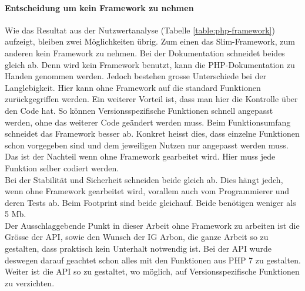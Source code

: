 \paragraph*{Entscheidung um kein Framework zu nehmen}
Wie das Resultat aus der Nutzwertanalyse (Tabelle \ref{table:php-framework}) aufzeigt, bleiben zwei Möglichkeiten übrig. Zum einen das Slim-Framework, zum anderen kein Framework zu nehmen. Bei der Dokumentation schneidet beides gleich ab. Denn wird kein Framework benutzt, kann die PHP-Dokumentation zu Handen genommen werden. Jedoch bestehen grosse Unterschiede bei der Langlebigkeit. Hier kann ohne Framework auf die standard Funktionen zurückgegriffen werden. Ein weiterer Vorteil ist, dass man hier die Kontrolle über den Code hat. So können Versionsspezifische Funktionen schnell angepasst werden, ohne das weiterer Code geändert werden muss. Beim Funktionsumfang schneidet das Framework besser ab. Konkret heisst dies, dass einzelne Funktionen schon vorgegeben sind und dem jeweiligen Nutzen nur angepasst werden muss. Das ist der Nachteil wenn ohne Framework gearbeitet wird. Hier muss jede Funktion selber codiert werden.\\
Bei der Stabilität und Sicherheit schneiden beide gleich ab. Dies hängt jedch, wenn ohne Framework gearbeitet wird, vorallem auch vom Programmierer und deren Tests ab. Beim Footprint sind beide gleichauf. Beide benötigen weniger als 5 Mb.\\
Der Ausschlaggebende Punkt in dieser Arbeit ohne Framework zu arbeiten ist die Grösse der API, sowie den Wunsch der IG Arbon, die ganze Arbeit so zu gestalten, dass praktisch kein Unterhalt notwendig ist. Bei der API wurde deswegen darauf geachtet schon alles mit den Funktionen aus PHP 7 zu gestalten. Weiter ist die API so zu gestaltet, wo möglich, auf Versionsspezifische Funktionen zu verzichten.



